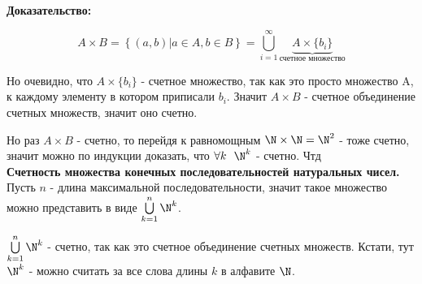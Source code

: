 \noindent \textbf{Доказательство:}

\begin{equation*}
    A \times B = \left\{ (a, b) | a \in A, b \in B \right\} = \bigcup\limits_{i = 1}^{\infty} \underbrace{A \times \{b_i\}}_{\text{счетное множество}}
\end{equation*}

Но очевидно, что $A \times \{b_i\}$ - счетное множество, так как это просто множество A, к каждому элементу в котором приписали $b_i$. Значит
$A \times B$ - счетное объединение счетных множеств, значит оно счетно.

Но раз $A \times B$ - счетно, то перейдя к равномощным $\N \times \N = \N^2$ - тоже счетно, значит можно по индукции доказать,
что $\forall k \ \ \N^k$ - счетно. Чтд\\

\textbf{Счетность множества конечных последовательностей натуральных чисел.}\\

Пусть $n$ - длина максимальной последовательности, значит такое множество можно представить в виде $\bigcup\limits_{k = 1}^{n} \N^k$.

$\bigcup\limits_{k = 1}^{n} \N^k$ - счетно, так как это счетное объединение счетных множеств. Кстати, тут
$\N^k$ - можно считать за все слова длины $k$ в алфавите $\N$.